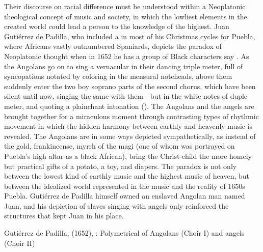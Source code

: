 Their discourse on racial difference must be understood within a Neoplatonic
theological concept of music and society, in which the lowliest elements in the
created world could lead a person to the knowledge of the highest.
Juan Gutiérrez de Padilla, who included a  in most of
his Christmas cycles for Puebla, where Africans vastly outnumbered Spaniards,
depicts the paradox of Neoplatonic thought when in 1652 he has a group of
Black characters say .%
   \Autocite{Sierra:UrbanSlavery} 
As the Angolans go on to sing a vernacular  in their
dancing triple meter, full of syncopations notated by coloring in the mensural
noteheads, above them suddenly enter the two boy soprano parts of the second
chorus, which have been silent until now, singing the same  with
them---but in the white notes of duple meter, and quoting a plainchant
intonation ().
The Angolans and the angels are brought together for a miraculous moment
through contrasting types of rhythmic movement in which the hidden harmony
between earthly and heavenly music is revealed.
The Angolans are in some ways depicted sympathetically, as instead
of the gold, frankincense, myrrh of the magi (one of whom was portrayed on
Puebla's high altar as a black African), bring the Christ-child the more homely
but practical gifts of a potato, a toy, and diapers.
The paradox is not only between the lowest kind of earthly music and the
highest music of heaven, but between the idealized world represented in the
music and the reality of 1650s Puebla.
Gutiérrez de Padilla himself owned an enslaved Angolan man named Juan, and
his depiction of slaves singing with angels only reinforced the structures that
kept Juan in his place.%
    \Autocite{Mauleon:PadillaCivil}


\begin{musicexample}
    \caption{Gutiérrez de Padilla,  (1652),
    : Polymetrical  of Angolans (Choir I) and
    angels (Choir II)} 
    \label{mus:Padilla-Al_establo-Gloria}
\end{musicexample}

